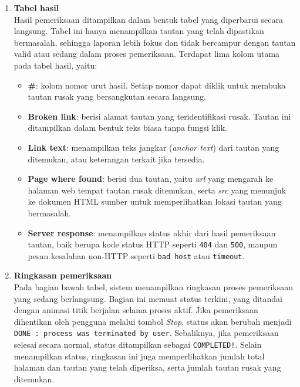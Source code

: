 \begin{enumerate}
    \item \textbf{Tabel hasil}\\
    Hasil pemeriksaan ditampilkan dalam bentuk tabel yang diperbarui secara langsung. Tabel ini hanya menampilkan tautan yang telah dipastikan bermasalah, sehingga laporan lebih fokus dan tidak bercampur dengan tautan valid atau sedang dalam proses pemeriksaan. Terdapat lima kolom utama pada tabel hasil, yaitu:
    
    \begin{itemize}
    
        \item \textbf{\#}: kolom nomor urut hasil. Setiap nomor dapat diklik untuk membuka tautan rusak yang bersangkutan secara langsung.
        
        \item \textbf{Broken link}: berisi alamat tautan yang teridentifikasi rusak. Tautan ini ditampilkan dalam bentuk teks biasa tanpa fungsi klik.
        
        \item \textbf{Link text}: menampilkan teks jangkar (\textit{anchor text}) dari tautan yang ditemukan, atau keterangan terkait jika tersedia.
        
        \item \textbf{Page where found}: berisi dua tautan, yaitu \textit{url} yang mengarah ke halaman web tempat tautan rusak ditemukan, serta \textit{src} yang menunjuk ke dokumen HTML sumber untuk memperlihatkan lokasi tautan yang bermasalah.
        
        \item \textbf{Server response}: menampilkan status akhir dari hasil pemeriksaan tautan, baik berupa kode status HTTP seperti \texttt{404} dan \texttt{500}, maupun pesan kesalahan non-HTTP seperti \texttt{bad host} atau \texttt{timeout}.
        
    \end{itemize}

    \item \textbf{Ringkasan pemeriksaan}\\
    Pada bagian bawah tabel, sistem menampilkan ringkasan proses pemeriksaan yang sedang berlangsung. Bagian ini memuat status terkini, yang ditandai dengan animasi titik berjalan selama proses aktif. Jika pemeriksaan dihentikan oleh pengguna melalui tombol \textit{Stop}, status akan berubah menjadi \texttt{DONE : process was terminated by user}. Sebaliknya, jika pemeriksaan selesai secara normal, status ditampilkan sebagai \texttt{COMPLETED!}. Selain menampilkan status, ringkasan ini juga memperlihatkan jumlah total halaman dan tautan yang telah diperiksa, serta jumlah tautan rusak yang ditemukan.
\end{enumerate}


